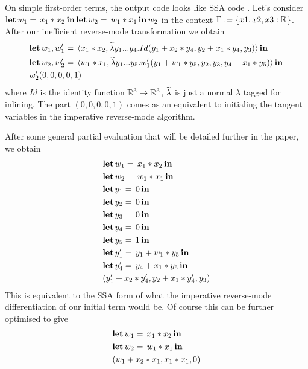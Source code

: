\begin{example}
On simple first-order terms, the output code looks like SSA code \cite{}.
Let's consider $\letin{w_1}{\var_1 * \var_2}{\letin{w_2}{w_1 * \var_1}{w_2}}$ in the context $\Gamma:=\{x1,x2,x3:\mathbb{R}\}$.\\
After our inefficient reverse-mode transformation we obtain
\begin{align*}
    &\letin{w_1,w_1'}{\tPair{\var_1 * \var_2}{\inllambda \var[2]_1...\var[2]_4.Id(\var[2]_1+\var_2*\var[2]_4,\var[2]_2+\var_1*\var[2]_4,\var[2]_3)} }{
    \\
    &\letin{w_2,w_2'}{\tPair{w_1 * \var_1}{\inllambda \var[2]_1...\var[2]_5.w_1'(\var[2]_1+w_1 * \var[2]_5,\var[2]_2,\var[2]_3,\var[2]_4+ \var_1 * \var[2]_5)}}{\\ 
    & w_2'(0,0,0,0,1)}}
\end{align*}
where $Id$ is the identity function $\mathbb{R}^3\to\mathbb{R}^3$, $\widetilde{\lambda}$ is just a normal $\lambda$ tagged for inlining.
The part $(0,0,0,0,1)$ comes as an equivalent to initialing the tangent variables in the imperative reverse-mode algorithm. 

After some general partial evaluation that will be detailed further in the paper, we obtain     
    	\begin{align*} 
    		&\letin{w_1}{\var_1 * \var_2}{\\
    		&\letin{w_2}{w_1 * \var_1}{\\
    		&\letin{\var[2]_1}{0}{\\
    		&\letin{\var[2]_2}{0}{\\
    		&\letin{\var[2]_3}{0}{\\
    		&\letin{\var[2]_4}{0}{\\
    		&\letin{\var[2]_5}{1}{\\
    		& \letin{\var[2]_1'}{\var[2]_1+w_1 * \var[2]_5}{\\
    		&\letin{\var[2]_4'}{\var[2]_4+ \var_1 * \var[2]_5}{\\
    		&(\var[2]_1'+\var_2*\var[2]_4',\var[2]_2+\var_1*\var[2]_4',\var[2]_3)
    		}}}}}}}}}
    	\end{align*}  
This is equivalent to the SSA form of what the imperative reverse-mode differentiation of our initial term would be.
Of course this can be further optimised to give
    	\begin{align*}
    		&\letin{w_1}{\var_1 * \var_2}{\\
    		&\letin{w_2}{w_1 * \var_1}{\\
    		&(w_1+\var_2*\var_1,\var_1*\var_1,0)
    		}}
    	\end{align*}
    \end{example}

